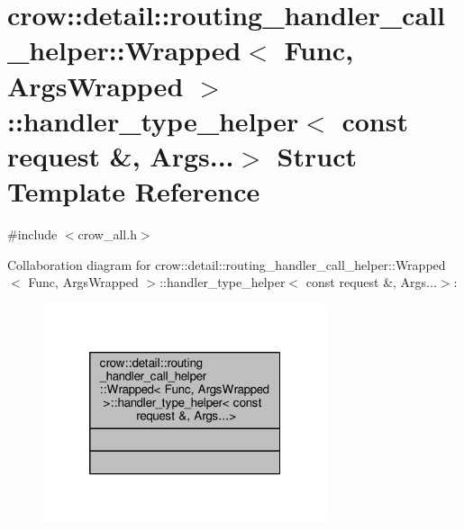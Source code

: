 \hypertarget{structcrow_1_1detail_1_1routing__handler__call__helper_1_1_wrapped_1_1handler__type__helper_3_01176bac6491f2834cd36a05c30aa75bc3}{\section{crow\-:\-:detail\-:\-:routing\-\_\-handler\-\_\-call\-\_\-helper\-:\-:Wrapped$<$ Func, Args\-Wrapped $>$\-:\-:handler\-\_\-type\-\_\-helper$<$ const request \&, Args...$>$ Struct Template Reference}
\label{structcrow_1_1detail_1_1routing__handler__call__helper_1_1_wrapped_1_1handler__type__helper_3_01176bac6491f2834cd36a05c30aa75bc3}
}


{\ttfamily \#include $<$crow\-\_\-all.\-h$>$}



Collaboration diagram for crow\-:\-:detail\-:\-:routing\-\_\-handler\-\_\-call\-\_\-helper\-:\-:Wrapped$<$ Func, Args\-Wrapped $>$\-:\-:handler\-\_\-type\-\_\-helper$<$ const request \&, Args...$>$\-:
\nopagebreak
\begin{figure}[H]
\begin{center}
\leavevmode
\includegraphics[width=236pt]{structcrow_1_1detail_1_1routing__handler__call__helper_1_1_wrapped_1_1handler__type__helper_3_017d5103563fc2cec5654e4f864d99c600}
\end{center}
\end{figure}
